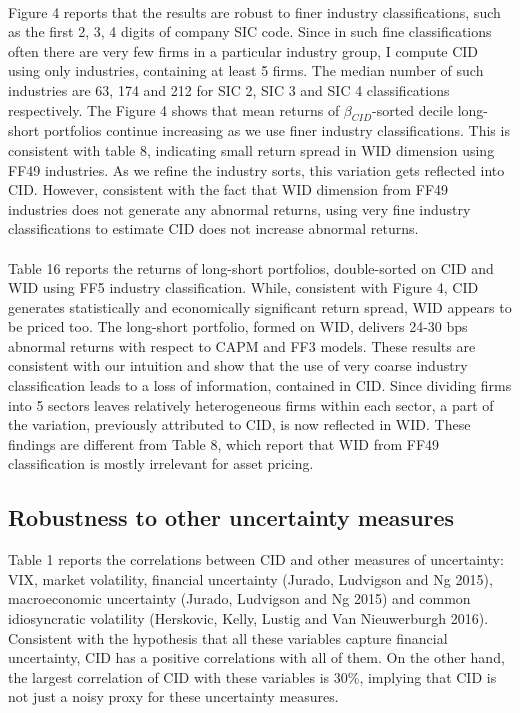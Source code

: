 \documentclass[12pt]{article}
\begin{document}
\paragraph{}
Figure 4 reports that the results are robust to finer industry classifications, such as the first 2, 3, 4 digits of company SIC code. Since in such fine classifications often there are very few firms in a particular industry group, I compute CID using only industries, containing at least 5 firms. The median number of such industries are 63, 174 and 212 for SIC 2, SIC 3 and SIC 4 classifications respectively. The Figure 4 shows that mean returns of $\beta_{CID}$-sorted decile long-short portfolios continue increasing as we use finer industry classifications. This is consistent with table 8, indicating small return spread in WID dimension using FF49 industries. As we refine the industry sorts, this variation gets reflected into CID. However, consistent with the fact that WID dimension from FF49 industries does not generate any abnormal returns, using very fine industry classifications to estimate CID does not increase abnormal returns.
\paragraph{}
Table 16 reports the returns of long-short portfolios, double-sorted on CID and WID using FF5 industry classification. While, consistent with Figure 4, CID generates statistically and economically significant return spread, WID appears to be priced too. The long-short portfolio, formed on WID, delivers 24-30 bps abnormal returns with respect to CAPM and FF3 models. These results are consistent with our intuition and show that the use of very coarse industry classification leads to a loss of information, contained in CID. Since dividing firms into 5 sectors leaves relatively heterogeneous firms within each sector, a part of the variation, previously attributed to CID, is now reflected in WID. These findings are different from Table 8, which report that WID from FF49 classification is mostly irrelevant for asset pricing. 

\subsection{Robustness to other uncertainty measures}

Table 1 reports the correlations between CID and other measures of uncertainty: VIX, market volatility, financial uncertainty (Jurado, Ludvigson and Ng 2015), macroeconomic uncertainty (Jurado, Ludvigson and Ng 2015) and common idiosyncratic volatility (Herskovic, Kelly, Lustig and Van Nieuwerburgh 2016). Consistent with the hypothesis that all these variables capture financial uncertainty, CID has a positive correlations with all of them. On the other hand, the largest correlation of CID with these variables is 30\%, implying that CID is not just a noisy proxy for these uncertainty measures.
\end{document}
